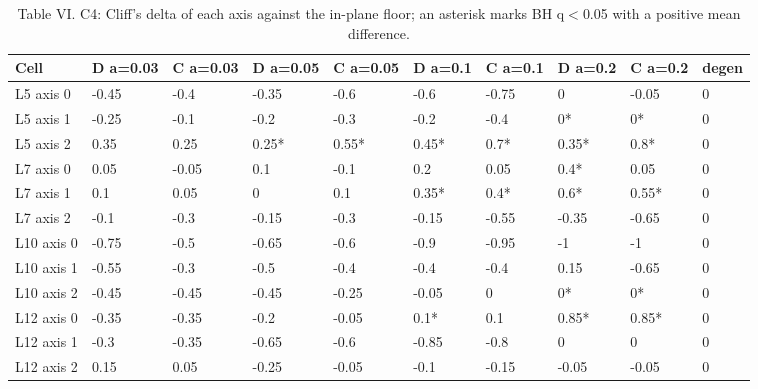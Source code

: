 \begin{table}[t]
\centering
\caption{Table VI. C4: Cliff's delta of each axis against the in-plane floor; an asterisk marks BH q$<$0.05 with a positive mean difference.}
\label{tab:vi}
\begin{tabular}{llllllllll}
\toprule
Cell & D a=0.03 & C a=0.03 & D a=0.05 & C a=0.05 & D a=0.1 & C a=0.1 & D a=0.2 & C a=0.2 & degen \\
\midrule
L5 axis 0 & -0.45 & -0.4 & -0.35 & -0.6 & -0.6 & -0.75 & 0 & -0.05 & 0 \\
L5 axis 1 & -0.25 & -0.1 & -0.2 & -0.3 & -0.2 & -0.4 & 0* & 0* & 0 \\
L5 axis 2 & 0.35 & 0.25 & 0.25* & 0.55* & 0.45* & 0.7* & 0.35* & 0.8* & 0 \\
L7 axis 0 & 0.05 & -0.05 & 0.1 & -0.1 & 0.2 & 0.05 & 0.4* & 0.05 & 0 \\
L7 axis 1 & 0.1 & 0.05 & 0 & 0.1 & 0.35* & 0.4* & 0.6* & 0.55* & 0 \\
L7 axis 2 & -0.1 & -0.3 & -0.15 & -0.3 & -0.15 & -0.55 & -0.35 & -0.65 & 0 \\
L10 axis 0 & -0.75 & -0.5 & -0.65 & -0.6 & -0.9 & -0.95 & -1 & -1 & 0 \\
L10 axis 1 & -0.55 & -0.3 & -0.5 & -0.4 & -0.4 & -0.4 & 0.15 & -0.65 & 0 \\
L10 axis 2 & -0.45 & -0.45 & -0.45 & -0.25 & -0.05 & 0 & 0* & 0* & 0 \\
L12 axis 0 & -0.35 & -0.35 & -0.2 & -0.05 & 0.1* & 0.1 & 0.85* & 0.85* & 0 \\
L12 axis 1 & -0.3 & -0.35 & -0.65 & -0.6 & -0.85 & -0.8 & 0 & 0 & 0 \\
L12 axis 2 & 0.15 & 0.05 & -0.25 & -0.05 & -0.1 & -0.15 & -0.05 & -0.05 & 0 \\
\bottomrule
\end{tabular}
\end{table}